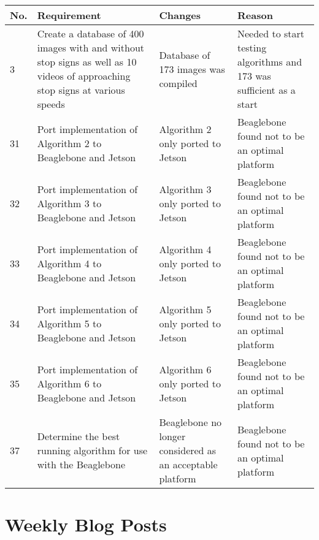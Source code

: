 \documentclass[letterpaper,10pt,titlepage]{article}
\begin{document}
\begin{center}
    \begin{tabular}{ | l | p{5cm} | p{5cm} | p{5cm} | }
    \hline
    No. & Requirement & Changes & Reason \\ \hline
    3 & Create a database of 400 images with and without stop signs as well as
    10 videos of approaching stop signs at various speeds & Database of 173
    images was compiled & Needed to start testing algorithms and 173 was
    sufficient as a start \\ \hline
    31 & Port implementation of Algorithm 2 to Beaglebone and Jetson & 
    Algorithm 2 only ported to Jetson & Beaglebone found not to be an optimal
    platform \\ \hline
    32 & Port implementation of Algorithm 3 to Beaglebone and Jetson & 
    Algorithm 3 only ported to Jetson & Beaglebone found not to be an optimal
    platform \\ \hline
    33 & Port implementation of Algorithm 4 to Beaglebone and Jetson & 
    Algorithm 4 only ported to Jetson & Beaglebone found not to be an optimal
    platform \\ \hline
    34 & Port implementation of Algorithm 5 to Beaglebone and Jetson & 
    Algorithm 5 only ported to Jetson & Beaglebone found not to be an optimal
    platform \\ \hline
    35 & Port implementation of Algorithm 6 to Beaglebone and Jetson & 
    Algorithm 6 only ported to Jetson & Beaglebone found not to be an optimal
    platform \\ \hline
    37 & Determine the best running algorithm for use with the Beaglebone &
    Beaglebone no longer considered as an acceptable platform & Beaglebone 
    found not to be an optimal platform \\ \hline
    \end{tabular}
\end{center}

\section*{Weekly Blog Posts}
\end{document}
